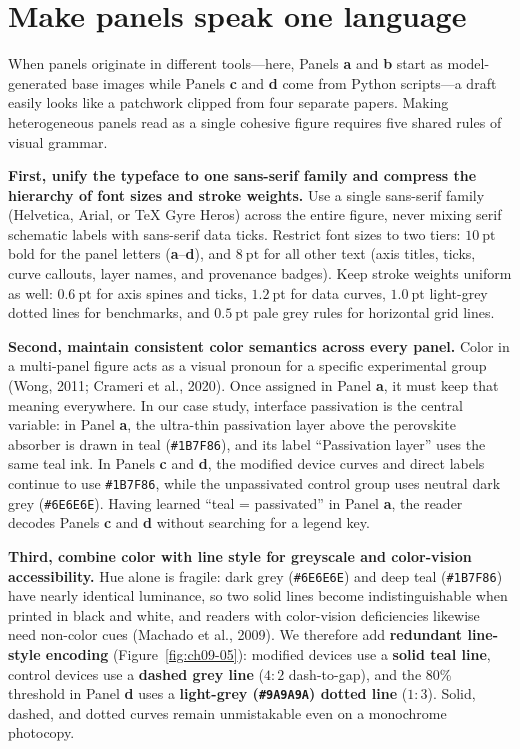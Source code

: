 \section{Make panels speak one language}

When panels originate in different tools---here, Panels \textbf{a} and \textbf{b} start as model-generated base images while Panels \textbf{c} and \textbf{d} come from Python scripts---a draft easily looks like a patchwork clipped from four separate papers. Making heterogeneous panels read as a single cohesive figure requires five shared rules of visual grammar.

\textbf{First, unify the typeface to one sans-serif family and compress the hierarchy of font sizes and stroke weights.}
Use a single sans-serif family (Helvetica, Arial, or TeX Gyre Heros) across the entire figure, never mixing serif schematic labels with sans-serif data ticks. Restrict font sizes to two tiers: $10\ \text{pt}$ bold for the panel letters (\textbf{a}--\textbf{d}), and $8\ \text{pt}$ for all other text (axis titles, ticks, curve callouts, layer names, and provenance badges). Keep stroke weights uniform as well: $0.6\ \text{pt}$ for axis spines and ticks, $1.2\ \text{pt}$ for data curves, $1.0\ \text{pt}$ light-grey dotted lines for benchmarks, and $0.5\ \text{pt}$ pale grey rules for horizontal grid lines.

\textbf{Second, maintain consistent color semantics across every panel.}
Color in a multi-panel figure acts as a visual pronoun for a specific experimental group (Wong, 2011; Crameri et al., 2020). Once assigned in Panel \textbf{a}, it must keep that meaning everywhere. In our case study, interface passivation is the central variable: in Panel \textbf{a}, the ultra-thin passivation layer above the perovskite absorber is drawn in teal (\texttt{\#1B7F86}), and its label ``Passivation layer'' uses the same teal ink. In Panels \textbf{c} and \textbf{d}, the modified device curves and direct labels continue to use \texttt{\#1B7F86}, while the unpassivated control group uses neutral dark grey (\texttt{\#6E6E6E}). Having learned ``teal = passivated'' in Panel \textbf{a}, the reader decodes Panels \textbf{c} and \textbf{d} without searching for a legend key.

\textbf{Third, combine color with line style for greyscale and color-vision accessibility.}
Hue alone is fragile: dark grey (\texttt{\#6E6E6E}) and deep teal (\texttt{\#1B7F86}) have nearly identical luminance, so two solid lines become indistinguishable when printed in black and white, and readers with color-vision deficiencies likewise need non-color cues (Machado et al., 2009). We therefore add \textbf{redundant line-style encoding} (Figure~\ref{fig:ch09-05}): modified devices use a \textbf{solid teal line}, control devices use a \textbf{dashed grey line} ($4:2$ dash-to-gap), and the 80\% threshold in Panel \textbf{d} uses a \textbf{light-grey (\texttt{\#9A9A9A}) dotted line} ($1:3$). Solid, dashed, and dotted curves remain unmistakable even on a monochrome photocopy.

